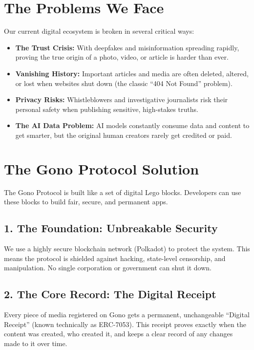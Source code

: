 \documentclass[12pt, a4paper]{article}
\begin{document}
\section{The Problems We Face}

Our current digital ecosystem is broken in several critical ways:

\begin{itemize}[leftmargin=*]
    \item \textbf{The Trust Crisis:} With deepfakes and misinformation spreading rapidly, proving the true origin of a photo, video, or article is harder than ever.
    \item \textbf{Vanishing History:} Important articles and media are often deleted, altered, or lost when websites shut down (the classic ``404 Not Found'' problem).
    \item \textbf{Privacy Risks:} Whistleblowers and investigative journalists risk their personal safety when publishing sensitive, high-stakes truths.
    \item \textbf{The AI Data Problem:} AI models constantly consume data and content to get smarter, but the original human creators rarely get credited or paid.
\end{itemize}

\section{The Gono Protocol Solution}

The Gono Protocol is built like a set of digital Lego blocks. Developers can use these blocks to build fair, secure, and permanent apps.

\subsection{1. The Foundation: Unbreakable Security}
We use a highly secure blockchain network (Polkadot) to protect the system. This means the protocol is shielded against hacking, state-level censorship, and manipulation. No single corporation or government can shut it down.

\subsection{2. The Core Record: The Digital Receipt}
Every piece of media registered on Gono gets a permanent, unchangeable ``Digital Receipt'' (known technically as ERC-7053). This receipt proves exactly when the content was created, who created it, and keeps a clear record of any changes made to it over time. 
\end{document}
